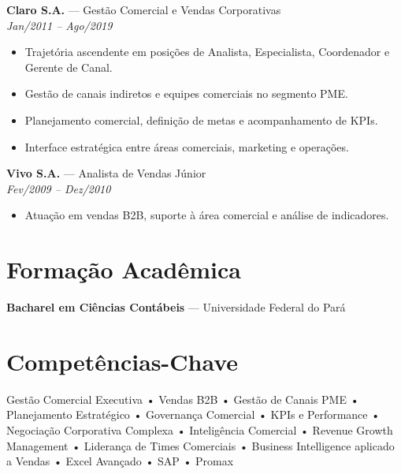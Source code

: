 \documentclass[11pt,a4paper]{article}
\begin{document}
\vspace{10pt}

\textbf{Claro S.A.} — Gestão Comercial e Vendas Corporativas\\
\textit{Jan/2011 -- Ago/2019}

\begin{itemize}
\item Trajetória ascendente em posições de Analista, Especialista, Coordenador e Gerente de Canal.
\item Gestão de canais indiretos e equipes comerciais no segmento PME.
\item Planejamento comercial, definição de metas e acompanhamento de KPIs.
\item Interface estratégica entre áreas comerciais, marketing e operações.
\end{itemize}

\vspace{10pt}

\textbf{Vivo S.A.} — Analista de Vendas Júnior\\
\textit{Fev/2009 -- Dez/2010}

\begin{itemize}
\item Atuação em vendas B2B, suporte à área comercial e análise de indicadores.
\end{itemize}

\vspace{14pt}
\section*{Formação Acadêmica}

\textbf{Bacharel em Ciências Contábeis} — Universidade Federal do Pará

\vspace{14pt}
\section*{Competências-Chave}

Gestão Comercial Executiva • Vendas B2B • Gestão de Canais PME • Planejamento Estratégico • Governança Comercial • KPIs e Performance • Negociação Corporativa Complexa • Inteligência Comercial • Revenue Growth Management • Liderança de Times Comerciais • Business Intelligence aplicado a Vendas • Excel Avançado • SAP • Promax
\end{document}
